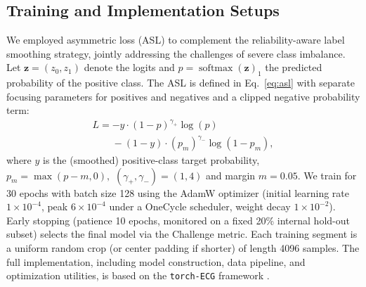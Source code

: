 \subsection{Training and Implementation Setups}
\label{subsec:train}


We employed asymmetric loss (ASL) \cite{ridnik2021asymmetric_loss} to complement the reliability-aware label smoothing strategy, jointly addressing the challenges of severe class imbalance. Let ${\mathbf{z}} = (z_0, z_1)$ denote the logits and $p=\operatorname{softmax}({\mathbf{z}})_1$ the predicted probability of the positive class. The ASL is defined in Eq.~\ref{eq:asl} with separate focusing parameters for positives and negatives and a clipped negative probability term:
\begin{equation}
\label{eq:asl}
\begin{multlined}
L = -y \cdot (1-p)^{\gamma_{+}} \log(p) \\
\phantom{L = } - (1-y) \cdot (p_m)^{\gamma_{-}} \log(1-p_m),
\end{multlined}
\end{equation}
where $y$ is the (smoothed) positive-class target probability, $p_m = \max(p - m, 0),$ $(\gamma_{+},\gamma_{-})=(1,4)$ and margin $m=0.05$. We train for 30 epochs with batch size 128 using the AdamW optimizer (initial learning rate $1\times10^{-4}$, peak $6\times10^{-4}$ under a OneCycle scheduler, weight decay $1\times10^{-2}$). Early stopping (patience 10 epochs, monitored on a fixed 20\% internal hold-out subset) selects the final model via the Challenge metric. Each training segment is a uniform random crop (or center padding if shorter) of length 4096 samples. The full implementation, including model construction, data pipeline, and optimization utilities, is based on the \texttt{torch-ECG} framework \cite{torch_ecg_paper}.
